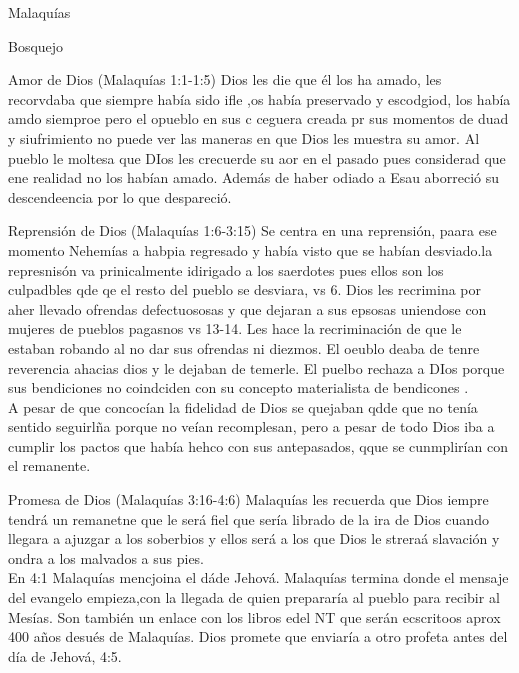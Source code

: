 \documentclass[12pt]{article}
\begin{document}
\begin{section}{Malaquías}
\begin{enumerate}
	\end{enumerate}
	\begin{subsection}{Bosquejo}
		\begin{subsubsection}{Amor de Dios (Malaquías 1:1-1:5)}
			Dios les die que él los ha amado, les recorvdaba que siempre había sido ifle ,os había preservado y escodgiod, los había amdo siemproe pero el opueblo en sus c ceguera creada pr sus momentos de duad y siufrimiento no puede ver las maneras en que Dios les muestra su amor. Al pueblo le moltesa que DIos les crecuerde su aor en el pasado pues considerad  que ene realidad no los habían amado. Además de haber odiado a Esau aborreció su descendeencia por lo que despareció.
		\end{subsubsection}
		\begin{subsubsection}{Reprensión de Dios (Malaquías 1:6-3:15)}
			Se centra en una reprensión, paara ese momento Nehemías a habpia regresado y había visto que se habían desviado.la represnisón va prinicalmente idirigado a los saerdotes pues ellos son los culpadbles qde qe el resto del pueblo se desviara, vs 6. Dios les recrimina por aher llevado ofrendas defectuososas y que dejaran a sus epsosas uniendose con mujeres de pueblos pagasnos vs 13-14. Les hace la recriminación de que le estaban robando al no dar sus ofrendas ni diezmos. El oeublo deaba de tenre reverencia ahacias dios y le dejaban de temerle. El puelbo rechaza a DIos porque sus bendiciones no coindciden con su concepto materialista de bendicones .\\
			A pesar de que concocían la fidelidad de Dios se quejaban qdde que no tenía sentido seguirlña porque no veían recomplesan, pero a pesar de todo Dios iba a cumplir los pactos que había hehco con sus antepasados, qque se cunmplirían con el remanente.
		\end{subsubsection}
		\begin{subsubsection}{Promesa de Dios (Malaquías 3:16-4:6)}
			Malaquías les recuerda que Dios iempre tendrá un remanetne que le será fiel que sería librado de la ira de Dios cuando llegara a ajuzgar a los soberbios y ellos será a los que Dios le streraá slavación y ondra a los malvados a sus pies. \\
			En 4:1 Malaquías mencjoina el dáde Jehová. Malaquías termina donde el mensaje del evangelo empieza,con la llegada de quien prepararía al pueblo para recibir al Mesías. Son también un enlace con los libros edel NT que serán ecscritoos aprox 400 años desués de Malaquías. Dios promete que enviaría a otro profeta antes del día de Jehová, 4:5.\\

\end{subsubsection}
\end{subsection}
\end{section}
\end{document}
